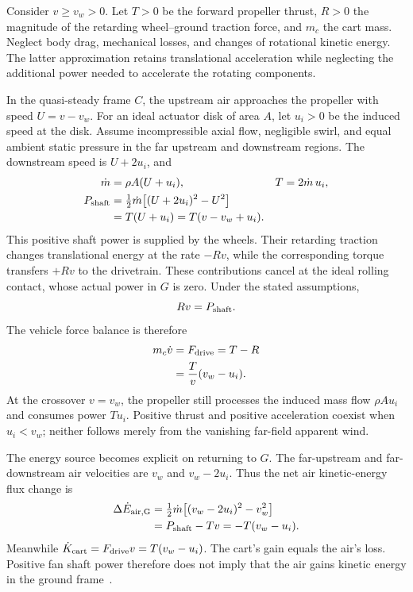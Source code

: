 \documentclass[reprint,aps,pra,longbibliography]{revtex4-2}
\begin{document}
Consider \(v\geq v_w>0\). Let \(T>0\) be the forward propeller thrust, \(R>0\) the magnitude of the retarding wheel--ground traction force, and \(m_c\) the cart mass. Neglect body drag, mechanical losses, and changes of rotational kinetic energy. The latter approximation retains translational acceleration while neglecting the additional power needed to accelerate the rotating components.

In the quasi-steady frame \(C\), the upstream air approaches the propeller with speed \(U=v-v_w\). For an ideal actuator disk of area \(A\), let \(u_i>0\) be the induced speed at the disk. Assume incompressible axial flow, negligible swirl, and equal ambient static pressure in the far upstream and downstream regions. The downstream speed is \(U+2u_i\), and
\begin{align}
\dot m &= \rho A(U+u_i), & T&=2\dot m\,u_i,
\label{eq:cart-mass-thrust}\\
P_{\rm shaft}
 &=\tfrac12\dot m\bigl[(U+2u_i)^2-U^2\bigr]\nonumber\\
 &=T(U+u_i)=T(v-v_w+u_i).
\label{eq:cart-shaft-power}
\end{align}
This positive shaft power is supplied by the wheels. Their retarding traction changes translational energy at the rate \(-Rv\), while the corresponding torque transfers \(+Rv\) to the drivetrain. These contributions cancel at the ideal rolling contact, whose actual power in \(G\) is zero. Under the stated assumptions,
\begin{equation}
Rv=P_{\rm shaft}.
\label{eq:cart-wheel-power}
\end{equation}
The vehicle force balance is therefore
\begin{align}
m_c\dot v&=F_{\rm drive}=T-R\nonumber\\
 &=\frac{T}{v}(v_w-u_i).
\label{eq:cart-net-drive}
\end{align}
At the crossover \(v=v_w\), the propeller still processes the induced mass flow \(\rho A u_i\) and consumes power \(Tu_i\). Positive thrust and positive acceleration coexist when \(u_i<v_w\); neither follows merely from the vanishing far-field apparent wind.

The energy source becomes explicit on returning to \(G\). The far-upstream and far-downstream air velocities are \(v_w\) and \(v_w-2u_i\). Thus the net air kinetic-energy flux change is
\begin{align}
\Delta\dot E_{\rm air,G}
 &=\tfrac12\dot m\bigl[(v_w-2u_i)^2-v_w^2\bigr]\nonumber\\
 &=P_{\rm shaft}-Tv=-T(v_w-u_i).
\label{eq:cart-air-power}
\end{align}
Meanwhile \(\dot K_{\rm cart}=F_{\rm drive}v=T(v_w-u_i)\). The cart's gain equals the air's loss. Positive fan shaft power therefore does not imply that the air gains kinetic energy in the ground frame~\cite{Gaunaa2009,AAPT2013}.
\end{document}
